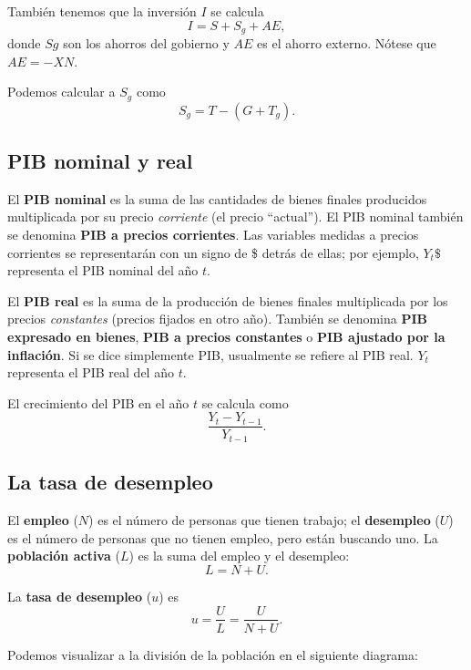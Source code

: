 \documentclass[10pt, landscape]{article}
\begin{document}
\begin{multicols*}{3}
También tenemos que la inversión $I$ se calcula
\[ I = S + S_g + AE, \]
donde $Sg$ son los ahorros del gobierno y $AE$ es el ahorro externo. Nótese que $AE = - XN$. 

Podemos calcular a $S_g$ como
\[ S_g = T - (G + T_g). \]

\subsection{PIB nominal y real}
El \textbf{PIB nominal} es la suma de las cantidades de bienes finales producidos multiplicada por su precio \textit{corriente} (el precio ``actual''). El PIB nominal también se denomina \textbf{PIB a precios corrientes}. Las variables medidas a precios corrientes se representarán con un signo de \$ detrás de ellas; por ejemplo, $Y_t\$$ representa el PIB nominal del año $t$.

El \textbf{PIB real} es la suma de la producción de bienes finales multiplicada por los precios \textit{constantes} (precios fijados en otro año). También se denomina \textbf{PIB expresado en bienes}, \textbf{PIB a precios constantes} o \textbf{PIB ajustado por la inflación}. Si se dice simplemente PIB, usualmente se refiere al PIB real. $Y_t$ representa el PIB real del año $t$.

El crecimiento del PIB en el año $t$ se calcula como
\[ \frac{Y_t - Y_{t-1}}{Y_{t-1}}. \]

\subsection{La tasa de desempleo}
El \textbf{empleo} ($N$) es el número de personas que tienen trabajo; el \textbf{desempleo} ($U$) es el número de personas que no tienen empleo, pero están buscando uno. La \textbf{población activa} ($L$) es la suma del empleo y el desempleo:
\[L = N + U.\]

La \textbf{tasa de desempleo} ($u$) es
\[ u = \frac{U}{L} = \frac{U}{N + U}. \]

Podemos visualizar a la división de la población en el siguiente diagrama:



\end{multicols*}
\end{document}
